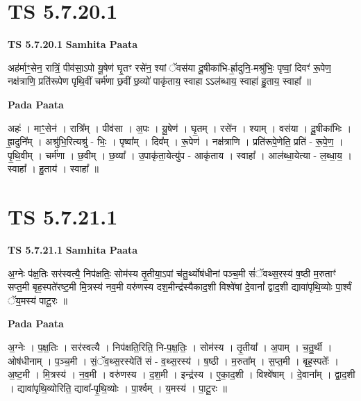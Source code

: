 \documentclass[17pt]{extarticle}
\begin{document}

\section{ TS 5.7.20.1 }

\textbf{TS 5.7.20.1 } \newline
\textbf{Samhita Paata} \newline

अह॑र्माꣳ॒॒सेन॒ रात्रिं॒ पीव॑सा॒ऽपो यू॒षेण॑ घृ॒तꣳ रसे॑न॒ श्यां ॅवस॑या दू॒षीका॑भि-र्ह्रा॒दुनि॒-मश्रु॑भिः॒ पृष्वां॒ दिवꣳ॑ रू॒पेण॒ नक्ष॑त्राणि॒ प्रति॑रूपेण पृथि॒वीं चर्म॑णा छ॒वीं छ॒व्यो॑ पाकृ॑ताय॒ स्वाहा ऽऽल॑ब्धाय॒ स्वाहा॑ हु॒ताय॒ स्वाहा᳚ ॥ \newline

\textbf{Pada Paata} \newline

अहः॑ । माꣳ॒॒सेन॑ । रात्रि᳚म् । पीव॑सा । अ॒पः । यू॒षेण॑ । घृ॒तम् । रसे॑न । श्याम् । वस॑या । दू॒षीका॑भिः । ह्रा॒दुनि᳚म् । अश्रु॑भि॒रित्यश्रु॑ - भिः॒ । पृष्वा᳚म् । दिव᳚म् । रू॒पेण॑ । नक्ष॑त्राणि । प्रति॑रूपे॒णेति॒ प्रति॑ - रू॒पे॒ण॒ । पृ॒थि॒वीम् । चर्म॑णा । छ॒वीम् । छ॒व्या᳚ । उ॒पाकृ॑ता॒येत्यु॑प - आकृ॑ताय । स्वाहा᳚ । आल॑ब्धा॒येत्या - ल॒ब्धा॒य॒ । स्वाहा᳚ । हु॒ताय॑ । स्वाहा᳚ ॥  \newline





\section{ TS 5.7.21.1 }

\textbf{TS 5.7.21.1 } \newline
\textbf{Samhita Paata} \newline

अ॒ग्नेः प॑क्ष॒तिः सर॑स्वत्यै॒ निप॑क्षतिः॒ सोम॑स्य तृ॒तीया॒ऽपां च॑तु॒र्थ्योष॑धीनां पञ्च॒मी सं॑ॅवथ्स॒रस्य॑ ष॒ष्ठी म॒रुताꣳ॑ सप्त॒मी बृह॒स्पते॑रष्ट॒मी मि॒त्रस्य॑ नव॒मी वरु॑णस्य दश॒मीन्द्र॑स्यैकाद॒शी विश्वे॑षां दे॒वानां᳚ द्वाद॒शी द्यावा॑पृथि॒व्योः पा॒र्श्वं ॅय॒मस्य॑ पाटू॒रः ॥ \newline

\textbf{Pada Paata} \newline

अ॒ग्नेः । प॒क्ष॒तिः । सर॑स्वत्यै । निप॑क्षति॒रिति॒ नि-प॒क्ष॒तिः॒ । सोम॑स्य । तृ॒तीया᳚ । अ॒पाम् । च॒तु॒र्थी । ओष॑धीनाम् । प॒ञ्च॒मी । सं॒ॅव॒थ्स॒रस्येति॑ सं - व॒थ्स॒रस्य॑ । ष॒ष्ठी । म॒रुता᳚म् । स॒प्त॒मी । बृह॒स्पतेः᳚ । अ॒ष्ट॒मी । मि॒त्रस्य॑ । न॒व॒मी । वरु॑णस्य । द॒श॒मी । इन्द्र॑स्य । ए॒का॒द॒शी । विश्वे॑षाम् । दे॒वाना᳚म् । द्वा॒द॒शी । द्यावा॑पृथि॒व्योरिति॒ द्यावा᳚-पृ॒थि॒व्योः । पा॒र्श्वम् । य॒मस्य॑ । पा॒टू॒रः ॥  \newline
\end{document}
